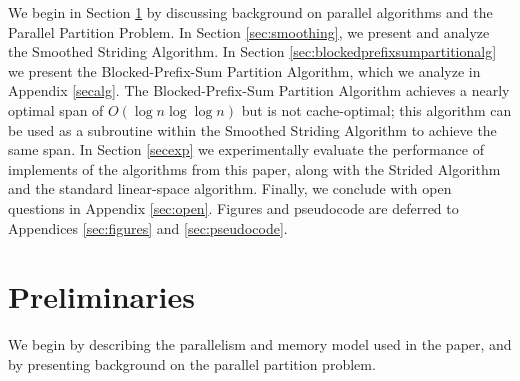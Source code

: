 \documentclass[twoside,leqno,twocolumn]{article}
\newcommand{\defn}[1]{{\textit{\textbf{\boldmath #1}}}}
\renewcommand{\paragraph}[1]{\vspace{0.09in}\noindent{\bf \boldmath #1.}}
\begin{document}


\paragraph{Outline} We begin in Section \ref{secprelim} by
discussing background on parallel algorithms and the Parallel
Partition Problem. In Section \ref{sec:smoothing}, we present and
analyze the Smoothed Striding Algorithm. In Section
\ref{sec:blockedprefixsumpartitionalg} we present the
Blocked-Prefix-Sum Partition Algorithm, which we analyze in
Appendix \ref{secalg}. The Blocked-Prefix-Sum Partition Algorithm
achieves a nearly optimal span of $O(\log n \log \log n)$ but is
not cache-optimal; this algorithm can be used as a subroutine
within the Smoothed Striding Algorithm to achieve the same span.
In Section \ref{secexp} we experimentally evaluate the
performance of implements of the algorithms from this paper,
along with the Strided Algorithm and the standard linear-space
algorithm. Finally, we conclude with open questions in
Appendix \ref{sec:open}. Figures and pseudocode are deferred to
Appendices \ref{sec:figures} and \ref{sec:pseudocode}.

\section{Preliminaries}\label{secprelim}

We begin by describing the parallelism and memory model used in
the paper, and by presenting background on the parallel partition problem.
\end{document}
